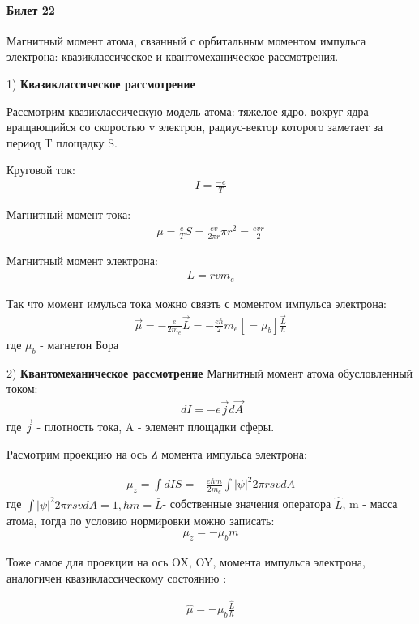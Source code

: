 \documentclass[__main__.tex]{subfiles}
\begin{document}
\paragraph{Билет 22}
Магнитный момент атома, свзанный с орбитальным моментом импульса электрона: квазиклассическое и квантомеханическое рассмотрения.

1) \textbf{Квазиклассическое рассмотрение}

Рассмотрим квазиклассическую модель атома: тяжелое ядро, вокруг ядра вращающийся со скоростью v электрон, радиус-вектор которого заметает за период T площадку S. 

Круговой ток:
\begin{gather}
\label{K24/1}
I=\frac{-e}{T} 
\end{gather}

Магнитный момент тока:
\begin{gather}
\label{K24/2}
 \mu=\frac{e}{T}S=\frac{ev}{2\pi r}\pi r^{2}= \frac{evr}{2} 
\end{gather}

Магнитный момент электрона:
\begin{gather}
\label{K24/3}
 L= r v m_{e} 
\end{gather}

Так что момент имульса тока можно связть с моментом импульса электрона:
\begin{gather}
\label{K24/4}
 \vec{\mu}= -\frac{e}{2m_{e}}\vec{L}= -\frac{e\hbar}{2} m_{e}[=\mu_{b}]\frac{\vec{L}}{\hbar} 
\end{gather}
 где $\mu_{b}$ - магнетон Бора
 
 2) \textbf{Квантомеханическое рассмотрение}
 Магнитный момент атома обусловленный током:
 \begin{gather}
 \label{K24/5}
  \ dI=-e\vec{j}d\vec{A}
 \end{gather}
 где $\vec{j}$ - плотность тока, A - элемент площадки сферы.
 
 Расмотрим проекцию на ось Z момента импульса электрона:
 
 \begin{gather}
 \label{K24/6}
 \mu_{z}=\int dI S= -\frac{e\hbar m}{2m_e} \int |\psi|^2 2 \pi r s v dA 
 \end{gather}
  где  $\int |\psi|^2 2 \pi r s v dA=1, \hbar m = \bar{L}$- собственные значения оператора $\hat{L}$,  m - масса атома, тогда  по условию нормировки
   можно записать:
   \begin{gather}
  \label{K24/7}
 \mu_{z} = -\mu_{b}m 
  \end{gather}
  
  Тоже самое для проекции на ось OX, OY,  момента импульса электрона, аналогичен квазиклассическому состоянию  :
  
  \begin{gather}
  \label{K24/8}
  \hat{\mu}=-\mu_{b}\frac{\hat{L}}{\hbar}
  \end{gather}
\end{document}
